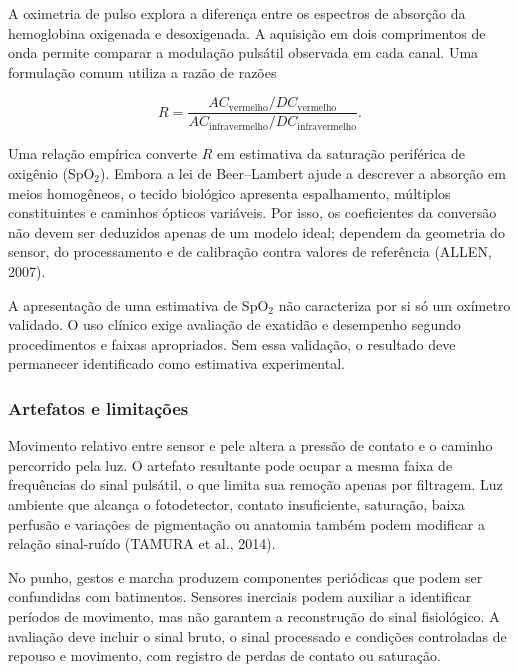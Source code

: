 \documentclass[a4paper,12pt]{article}
\begin{document}
A oximetria de pulso explora a diferen\c{c}a entre os espectros de absor\c{c}\~ao da hemoglobina oxigenada e desoxigenada. A aquisi\c{c}\~ao em dois comprimentos de onda permite comparar a modula\c{c}\~ao puls\'atil observada em cada canal. Uma formula\c{c}\~ao comum utiliza a raz\~ao de raz\~oes


\[
R=\frac{AC_{\mathrm{vermelho}}/DC_{\mathrm{vermelho}}}
        {AC_{\mathrm{infravermelho}}/DC_{\mathrm{infravermelho}}}.
\]


Uma rela\c{c}\~ao emp\'irica converte \(R\) em estimativa da satura\c{c}\~ao perif\'erica de oxig\^enio (SpO$_2$). Embora a lei de Beer--Lambert ajude a descrever a absor\c{c}\~ao em meios homog\^eneos, o tecido biol\'ogico apresenta espalhamento, m\'ultiplos constituintes e caminhos \'opticos vari\'aveis. Por isso, os coeficientes da convers\~ao n\~ao devem ser deduzidos apenas de um modelo ideal; dependem da geometria do sensor, do processamento e de calibra\c{c}\~ao contra valores de refer\^encia (ALLEN, 2007).


A apresenta\c{c}\~ao de uma estimativa de SpO$_2$ n\~ao caracteriza por si s\'o um ox\'imetro validado. O uso cl\'inico exige avalia\c{c}\~ao de exatid\~ao e desempenho segundo procedimentos e faixas apropriados. Sem essa valida\c{c}\~ao, o resultado deve permanecer identificado como estimativa experimental.


\subsubsection{Artefatos e limita\c{c}\~oes}


Movimento relativo entre sensor e pele altera a press\~ao de contato e o caminho percorrido pela luz. O artefato resultante pode ocupar a mesma faixa de frequ\^encias do sinal puls\'atil, o que limita sua remo\c{c}\~ao apenas por filtragem. Luz ambiente que alcan\c{c}a o fotodetector, contato insuficiente, satura\c{c}\~ao, baixa perfus\~ao e varia\c{c}\~oes de pigmenta\c{c}\~ao ou anatomia tamb\'em podem modificar a rela\c{c}\~ao sinal-ru\'ido (TAMURA et al., 2014).


No punho, gestos e marcha produzem componentes peri\'odicas que podem ser confundidas com batimentos. Sensores inerciais podem auxiliar a identificar per\'iodos de movimento, mas n\~ao garantem a reconstru\c{c}\~ao do sinal fisiol\'ogico. A avalia\c{c}\~ao deve incluir o sinal bruto, o sinal processado e condi\c{c}\~oes controladas de repouso e movimento, com registro de perdas de contato ou satura\c{c}\~ao.
\end{document}
